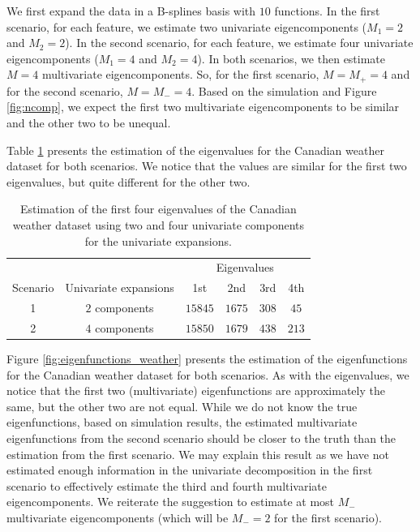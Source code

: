 We first expand the data in a B-splines basis with $10$ functions. In the first scenario, for each feature, we estimate two univariate eigencomponents ($M_1 = 2$ and $M_2 = 2$). In the second scenario, for each feature, we estimate four univariate eigencomponents ($M_1 = 4$ and $M_2 = 4$). In both scenarios, we then estimate $M = 4$ multivariate eigencomponents. So, for the first scenario, $M = M_{+} = 4$ and for the second scenario, $M = M_{-} = 4$. Based on the simulation and Figure \ref{fig:ncomp}, we expect the first two multivariate eigencomponents to be similar and the other two to be unequal.

Table \ref{tab:eigenvalues} presents the estimation of the eigenvalues for the Canadian weather dataset for both scenarios. We notice that the values are similar for the first two eigenvalues, but quite different for the other two. 

\begin{table}[!h]
\centering
\begin{tabular}{c c | c c c c}
 & & \multicolumn{4}{c}{Eigenvalues} \\
Scenario & Univariate expansions & 1st & 2nd & 3rd & 4th \\
\hline
1 & $2$ components & $15845$ & $1675$ & $308$ & $45$ \\
2 & $4$ components & $15850$ & $1679$ & $438$ & $213$ \\
\hline
\end{tabular}
\caption{Estimation of the first four eigenvalues of the Canadian weather dataset using two and four univariate components for the univariate expansions.}
\label{tab:eigenvalues}
\end{table}

Figure \ref{fig:eigenfunctions_weather} presents the estimation of the eigenfunctions for the Canadian weather dataset for both scenarios. As with the eigenvalues, we notice that the first two (multivariate) eigenfunctions are approximately the same, but the other two are not equal. While we do not know the true eigenfunctions, based on simulation results, the estimated multivariate eigenfunctions from the second scenario should be closer to the truth than the estimation from the first scenario. We may explain this result as we have not estimated enough information in the univariate decomposition in the first scenario to effectively estimate the third and fourth multivariate eigencomponents. We reiterate the suggestion to estimate at most $M_{-}$ multivariate eigencomponents (which will be $M_{-} = 2$ for the first scenario).

